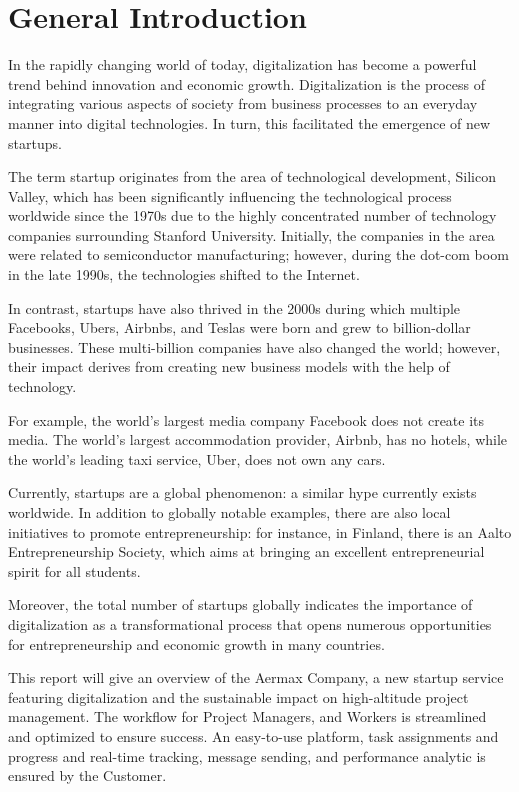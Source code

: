 \thispagestyle{plain} %
\section*{General Introduction}

In the rapidly changing world of today, digitalization has become a powerful trend behind innovation and economic growth.
Digitalization is the process of integrating various aspects of society from business processes to an everyday manner into digital technologies. In turn, this facilitated the emergence of new startups.

The term startup originates from the area of technological development, Silicon Valley, which has been significantly influencing the technological process worldwide since the 1970s due to the highly concentrated number of technology companies surrounding Stanford University. Initially, the companies in the area were related to semiconductor manufacturing; however, during the dot-com boom in the late 1990s, the technologies shifted to the Internet.

In contrast, startups have also thrived in the 2000s during which multiple Facebooks, Ubers, Airbnbs, and Teslas were born and grew to billion-dollar businesses. These multi-billion companies have also changed the world; however, their impact derives from creating new business models with the help of technology.

For example, the world’s largest media company Facebook does not create its media. 
The world’s largest accommodation provider, Airbnb, has no hotels, while the world’s leading taxi service, Uber, does not own any cars.

Currently, startups are a global phenomenon: a similar hype currently exists worldwide.
In addition to globally notable examples, there are also local initiatives to promote entrepreneurship: for instance, in Finland, there is an Aalto Entrepreneurship Society, which aims at bringing an excellent entrepreneurial spirit for all students.

Moreover, the total number of startups globally indicates the importance of digitalization as a transformational process that opens numerous opportunities for entrepreneurship and economic growth in many countries.

This report will give an overview of the Aermax Company, a new startup service featuring digitalization and the sustainable impact on high-altitude project management. The workflow for Project Managers, and Workers is streamlined and optimized to ensure success.
An easy-to-use platform, task assignments and progress and real-time tracking, message sending, and performance analytic is ensured by the Customer. 

\newpage
